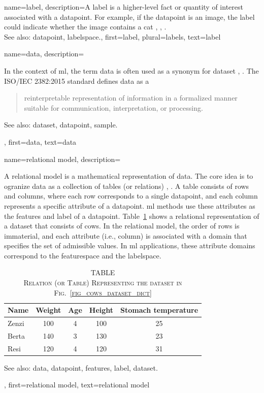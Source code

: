 {name={label},
	description={A label is a higher-level fact or quantity of interest associated 
		with a \gls{datapoint}. For example, if the \gls{datapoint} is an image, the label 
		could indicate whether the image contains a cat 
		\cite{Everitt2010}, \cite{Gujarati2021}, \cite{Dodge2003}.
				\\
		See also: \gls{datapoint}, \gls{labelspace}.},
	first={label},
	plural={labels},
	text={label}  
}

{name={data},
	description={In the context of \gls{ml}, the term 
 		data is often used as a synonym for \gls{dataset}
  		\cite{Everitt2010}, \cite{OxfordStatisticsDictionary}. 
  		The ISO/IEC 2382:2015 standard \cite{ISO2382} defines data as a \begin{quote} reinterpretable representation of 
  		information in a formalized manner suitable for communication, interpretation, or processing.\end{quote}
  		See also: \gls{dataset}, \gls{datapoint}, \gls{sample}.}, 
  	first={data},
	text={data}
}

{name={relational model},
	description={A relational \gls{model} is a mathematical representation of \gls{data}. 
		The core idea is to ogranize \gls{data} as a collection of 
		tables (or relations) \cite{silberschatz2019database}, \cite{codd1970relational}. 
		A table consists of rows and columns, where each 
		row corresponds to a single \gls{datapoint}, and each 
		column represents a specific attribute of a \gls{datapoint}. 
		\gls{ml} methods use these attributes as the \glspl{feature} 
		and \gls{label} of a \gls{datapoint}. Table~\ref{tab:relmodel_dict} shows 
		a relational representation of a \gls{dataset} that consists of cows. 
		In the relational \gls{model}, the order of rows is immaterial, and each 
		attribute (i.e., column) is associated with a \gls{domain} that specifies the set 
		of admissible values. 
		In \gls{ml} applications, these attribute \glspl{domain} correspond to the 
		\gls{featurespace} and the \gls{labelspace}.
				\begin{table}[H]
					\caption*{
						\centering 
						\scshape TABLE \thetable \\[0.5ex]
						\scshape Relation (or Table) Representing the \gls{dataset} in Fig.\ \ref{fig_cows_dataset_dict} 
					}
					\label{tab:relmodel_dict} 
					\centering
					\begin{tabular}{lcccc}
						\hline
						\textbf{Name} & \textbf{Weight} & \textbf{Age} & \textbf{Height} & \textbf{Stomach temperature} \\
						\hline
						Zenzi & 100 & 4 & 100 & 25 \\
						Berta & 140 & 3 & 130 & 23 \\
						Resi  & 120 & 4 & 120 & 31 \\
						\hline
					\end{tabular}
				\end{table}
		See also: \gls{data}, \gls{datapoint}, \glspl{feature}, \gls{label}, \gls{dataset}.}, 
	first={relational model},
	text={relational model}
}
  		
